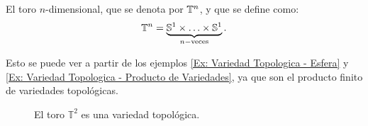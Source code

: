 \begin{example}[$n-$Toro]\label{Ex: Variedad Topologica - Toro}
	El toro $n$-dimensional, que se denota por $\mathbb{T}^n$, y que se define como:
	\[
		\mathbb{T}^n = \underbrace{\mathbb{S}^1 \times \hdots \times \mathbb{S}^1}_{n-\text{veces}}.
	\]

	Esto se puede ver a partir de los ejemplos \ref{Ex: Variedad Topologica - Esfera} y \ref{Ex: Variedad Topologica - Producto de Variedades}, ya que son el producto finito de variedades topológicas.
\end{example}

\begin{figure}[h]
	\centering
	
	\caption{El toro $\mathbb{T}^{2}$ es una variedad topológica.}
\end{figure}
